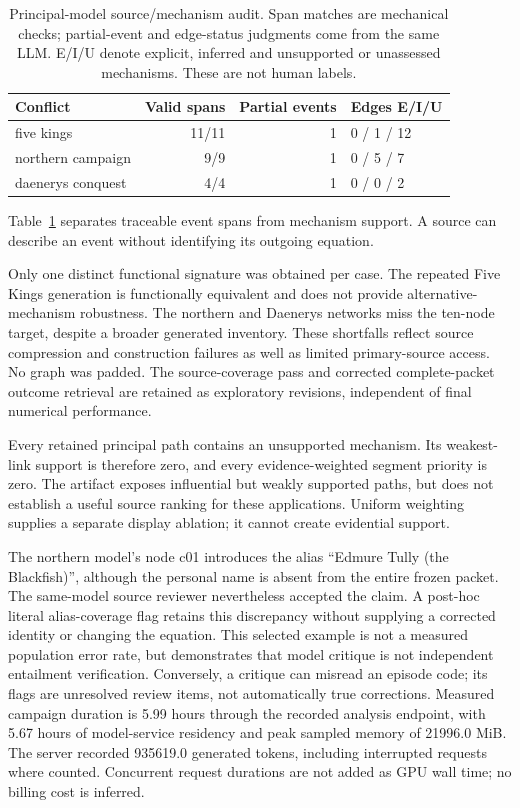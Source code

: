 \documentclass{svproc}
\begin{document}
\begin{table}[t]\centering\caption{Principal-model source/mechanism audit. Span matches are mechanical checks; partial-event and edge-status judgments come from the same LLM. E/I/U denote explicit, inferred and unsupported or unassessed mechanisms. These are not human labels.}\label{tab:audit}
\begin{tabular}{lrrl}\toprule Conflict & Valid spans & Partial events & Edges E/I/U \\\midrule
five kings & 11/11 & 1 & 0 / 1 / 12 \\
northern campaign & 9/9 & 1 & 0 / 5 / 7 \\
daenerys conquest & 4/4 & 1 & 0 / 0 / 2 \\
\bottomrule\end{tabular}\end{table}
Table~\ref{tab:audit} separates traceable event spans from mechanism support. A source can describe an event without identifying its outgoing equation.

Only one distinct functional signature was obtained per case. The repeated Five Kings generation is functionally equivalent and does not provide alternative-mechanism robustness. The northern and Daenerys networks miss the ten-node target, despite a broader generated inventory. These shortfalls reflect source compression and construction failures as well as limited primary-source access. No graph was padded. The source-coverage pass and corrected complete-packet outcome retrieval are retained as exploratory revisions, independent of final numerical performance.

Every retained principal path contains an unsupported mechanism. Its weakest-link support is therefore zero, and every evidence-weighted segment priority is zero. The artifact exposes influential but weakly supported paths, but does not establish a useful source ranking for these applications. Uniform weighting supplies a separate display ablation; it cannot create evidential support.

The northern model's node c01 introduces the alias ``Edmure Tully (the Blackfish)'', although the personal name is absent from the entire frozen packet. The same-model source reviewer nevertheless accepted the claim. A post-hoc literal alias-coverage flag retains this discrepancy without supplying a corrected identity or changing the equation. This selected example is not a measured population error rate, but demonstrates that model critique is not independent entailment verification. Conversely, a critique can misread an episode code; its flags are unresolved review items, not automatically true corrections.
Measured campaign duration is 5.99 hours through the recorded analysis endpoint, with 5.67 hours of model-service residency and peak sampled memory of 21996.0 MiB. The server recorded 935619.0 generated tokens, including interrupted requests where counted. Concurrent request durations are not added as GPU wall time; no billing cost is inferred.
\end{document}
